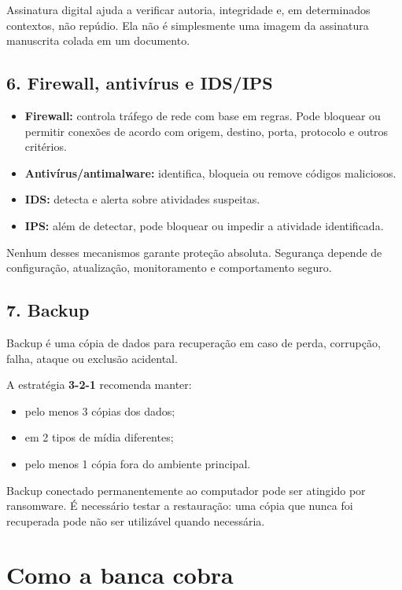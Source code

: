 \documentclass[11pt,a4paper]{article}
\begin{document}
Assinatura digital ajuda a verificar autoria, integridade e, em determinados contextos, não repúdio. Ela não é simplesmente uma imagem da assinatura manuscrita colada em um documento.

\subsection*{6. Firewall, antivírus e IDS/IPS}

\begin{itemize}
  \item \textbf{Firewall:} controla tráfego de rede com base em regras. Pode bloquear ou permitir conexões de acordo com origem, destino, porta, protocolo e outros critérios.
  \item \textbf{Antivírus/antimalware:} identifica, bloqueia ou remove códigos maliciosos.
  \item \textbf{IDS:} detecta e alerta sobre atividades suspeitas.
  \item \textbf{IPS:} além de detectar, pode bloquear ou impedir a atividade identificada.
\end{itemize}

Nenhum desses mecanismos garante proteção absoluta. Segurança depende de configuração, atualização, monitoramento e comportamento seguro.

\subsection*{7. Backup}

Backup é uma cópia de dados para recuperação em caso de perda, corrupção, falha, ataque ou exclusão acidental.

A estratégia \textbf{3-2-1} recomenda manter:

\begin{itemize}
  \item pelo menos 3 cópias dos dados;
  \item em 2 tipos de mídia diferentes;
  \item pelo menos 1 cópia fora do ambiente principal.
\end{itemize}

Backup conectado permanentemente ao computador pode ser atingido por ransomware. É necessário testar a restauração: uma cópia que nunca foi recuperada pode não ser utilizável quando necessária.

\section*{Como a banca cobra}
\end{document}
